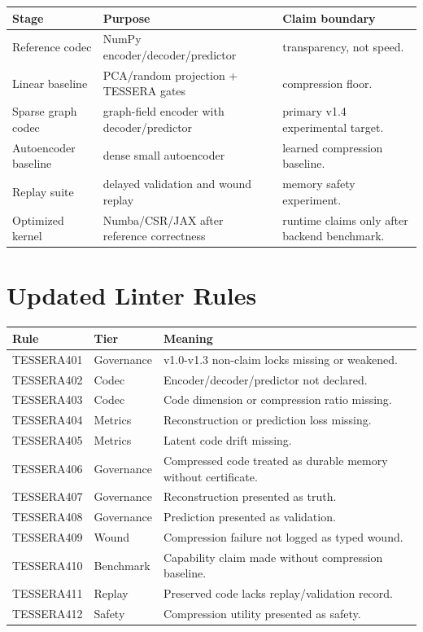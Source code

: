 \documentclass[12pt]{article}
\begin{document}
\begin{longtable}{p{}p{}p{}}
\toprule
\textbf{Stage} & \textbf{Purpose} & \textbf{Claim boundary} \\
\midrule
Reference codec & NumPy encoder/decoder/predictor & transparency, not speed. \\
Linear baseline & PCA/random projection + TESSERA gates & compression floor. \\
Sparse graph codec & graph-field encoder with decoder/predictor & primary v1.4 experimental target. \\
Autoencoder baseline & dense small autoencoder & learned compression baseline. \\
Replay suite & delayed validation and wound replay & memory safety experiment. \\
Optimized kernel & Numba/CSR/JAX after reference correctness & runtime claims only after backend benchmark. \\
\bottomrule
\end{longtable}

\section{Updated Linter Rules}

\begin{longtable}{p{}p{}p{}}
\toprule
\textbf{Rule} & \textbf{Tier} & \textbf{Meaning} \\
\midrule
TESSERA401 & Governance & v1.0-v1.3 non-claim locks missing or weakened. \\
TESSERA402 & Codec & Encoder/decoder/predictor not declared. \\
TESSERA403 & Codec & Code dimension or compression ratio missing. \\
TESSERA404 & Metrics & Reconstruction or prediction loss missing. \\
TESSERA405 & Metrics & Latent code drift missing. \\
TESSERA406 & Governance & Compressed code treated as durable memory without certificate. \\
TESSERA407 & Governance & Reconstruction presented as truth. \\
TESSERA408 & Governance & Prediction presented as validation. \\
TESSERA409 & Wound & Compression failure not logged as typed wound. \\
TESSERA410 & Benchmark & Capability claim made without compression baseline. \\
TESSERA411 & Replay & Preserved code lacks replay/validation record. \\
TESSERA412 & Safety & Compression utility presented as safety. \\
\bottomrule
\end{longtable}
\end{document}
